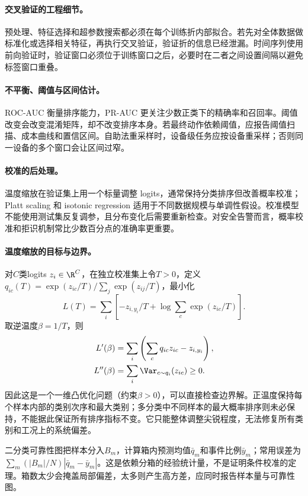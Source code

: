 \paragraph{交叉验证的工程细节。}
预处理、特征选择和超参数搜索都必须在每个训练折内部拟合。若先对全体数据做标准化或选择相关特征，再执行交叉验证，验证折的信息已经泄漏。时间序列使用前向验证时，验证窗口必须位于训练窗口之后，必要时在二者之间设置间隔以避免标签窗口重叠。

\paragraph{不平衡、阈值与区间估计。}
ROC-AUC 衡量排序能力，PR-AUC 更关注少数正类下的精确率和召回率。阈值改变会改变混淆矩阵，却不改变排序本身。若最终动作依赖阈值，应报告阈值扫描、成本曲线和置信区间。自助法重采样时，设备级任务应按设备重采样；否则同一设备的多个窗口会让区间过窄。

\paragraph{校准的后处理。}
温度缩放在验证集上用一个标量调整 logits，通常保持分类排序但改善概率校准；Platt scaling 和 isotonic regression 适用于不同数据规模与单调性假设。校准模型不能使用测试集反复调参，且分布变化后需要重新检查。对安全告警而言，概率校准和拒识机制常比少数百分点的准确率更重要。

\paragraph{温度缩放的目标与边界。}
对$C$类logits $z_i\in\R^C$，在独立校准集上令$T>0$，定义$q_{ic}(T)=\exp(z_{ic}/T)/\sum_j\exp(z_{ij}/T)$，最小化
\begin{equation}
 L(T)=\sum_i\left[-z_{i,y_i}/T+\log\sum_c\exp(z_{ic}/T)\right].
\end{equation}
取逆温度$\beta=1/T$，则
\begin{align}
 L'(\beta)&=\sum_i\left(\sum_cq_{ic}z_{ic}-z_{i,y_i}\right),\\
 L''(\beta)&=\sum_i\Var_{c\sim q_i}(z_{ic})\geq0.
\end{align}
因此这是一个一维凸优化问题（约束$\beta>0$），可以直接检查边界解。正温度保持每个样本内部的类别次序和最大类别；多分类中不同样本的最大概率排序则未必保持，不能据此保证所有排序指标不变。它只能整体调整尖锐程度，无法修复所有类别和工况上的系统偏差。

二分类可靠性图把样本分入$B_m$，计算箱内预测均值$\bar q_m$和事件比例$\bar y_m$；常用误差为$\sum_m(|B_m|/N)|\bar q_m-\bar y_m|$。这是依赖分箱的经验统计量，不是证明条件校准的定理。箱数太少会掩盖局部偏差，太多则产生高方差，应同时报告样本量与可靠性图。

